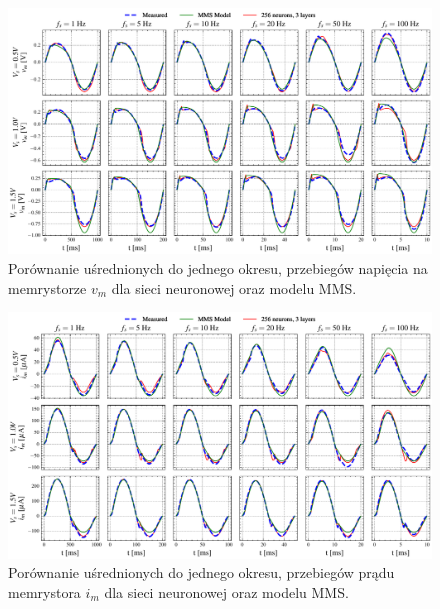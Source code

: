 \documentclass[11pt, oneside]{article}
\begin{document}
\begin{figure}[htbp!]
    \centering
    \includegraphics[width=\linewidth]{mms_results/simulated_vms.pdf}
    \caption{Porównanie uśrednionych do jednego okresu, przebiegów napięcia na memrystorze $v_m$ dla sieci neuronowej oraz modelu MMS.}
    \label{fig:mms_vms}
\end{figure}

\begin{figure}[htbp!]
    \centering
    \includegraphics[width=\linewidth]{mms_results/simulated_ims.pdf}
    \caption{Porównanie uśrednionych do jednego okresu, przebiegów prądu memrystora $i_m$ dla sieci neuronowej oraz modelu MMS.}
    \label{fig:mms_ims}
\end{figure}
\end{document}
